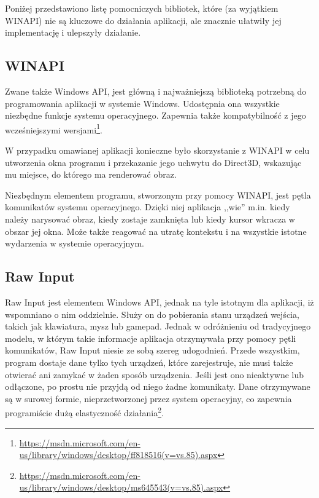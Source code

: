 	Poniżej przedstawiono listę pomocniczych bibliotek, które (za wyjątkiem WINAPI) nie są kluczowe do działania aplikacji, ale znacznie ułatwiły jej implementację i ulepszyły działanie.
	
		\subsection{WINAPI}
		\label{t:technologie:helpers:winapi}
		
		Zwane także Windows API, jest główną i najważniejszą biblioteką potrzebną do programowania aplikacji w systemie Windows. Udostępnia ona wszystkie niezbędne funkcje systemu operacyjnego. Zapewnia także kompatybilność z jego wcześniejszymi wersjami\footnote{\url{https://msdn.microsoft.com/en-us/library/windows/desktop/ff818516(v=vs.85).aspx}}.
		
		W przypadku omawianej aplikacji konieczne było skorzystanie z WINAPI w celu utworzenia okna programu i przekazanie jego uchwytu do Direct3D, wskazując mu miejsce, do którego ma renderować obraz.
		
		Niezbędnym elementem programu, stworzonym przy pomocy WINAPI, jest pętla komunikatów systemu operacyjnego. Dzięki niej aplikacja ,,wie'' m.in. kiedy należy narysować obraz, kiedy zostaje zamknięta lub kiedy kursor wkracza w obszar jej okna. Może także reagować na utratę kontekstu i na wszystkie istotne wydarzenia w systemie operacyjnym.
		
		\subsection{Raw Input}
		\label{t:technologie:helpers:rawinput}
		
		Raw Input jest elementem Windows API, jednak na tyle istotnym dla aplikacji, iż wspomniano o nim oddzielnie. Służy on do pobierania stanu urządzeń wejścia, takich jak klawiatura, mysz lub gamepad. Jednak w odróżnieniu od tradycyjnego modelu, w którym takie informacje aplikacja otrzymywała przy pomocy pętli komunikatów, Raw Input niesie ze sobą szereg udogodnień. Przede wszystkim, program dostaje dane tylko tych urządzeń, które zarejestruje, nie musi także otwierać ani zamykać w żaden sposób urządzenia. Jeśli jest ono nieaktywne lub odłączone, po prostu nie przyjdą od niego żadne komunikaty. Dane otrzymywane są w surowej formie, nieprzetworzonej przez system operacyjny, co zapewnia programiście dużą elastyczność działania\footnote{\url{https://msdn.microsoft.com/en-us/library/windows/desktop/ms645543(v=vs.85).aspx}}.
		
